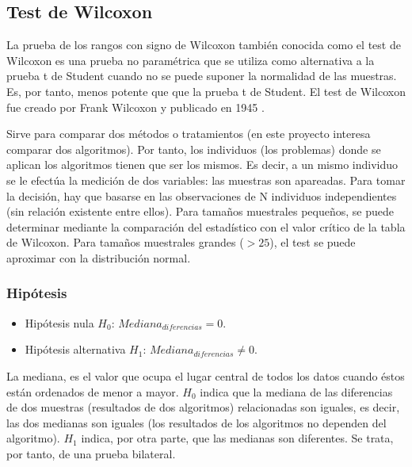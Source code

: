 
\subsection{Test de Wilcoxon}
La prueba de los rangos con signo de Wilcoxon también conocida como el test de Wilcoxon es una prueba no
paramétrica que se utiliza como alternativa a la prueba t de Student cuando no se puede suponer la normalidad
de las muestras. Es, por tanto, menos potente que que la prueba t de Student. El test de Wilcoxon fue creado
por Frank Wilcoxon y publicado en 1945 \cite{wilcoxon}.

Sirve para comparar dos métodos o tratamientos (en este proyecto interesa comparar dos algoritmos). Por tanto,
los individuos (los problemas) donde se aplican los algoritmos tienen que ser los mismos. Es decir, a un mismo
individuo se le efectúa la medición de dos variables: las muestras son apareadas. Para tomar la decisión, hay
que basarse en las observaciones de N individuos independientes (sin relación existente entre ellos). Para tamaños
muestrales pequeños, se puede determinar mediante la comparación del estadístico con el valor crítico de la
tabla de Wilcoxon. Para tamaños muestrales grandes ($> 25$), el test se puede aproximar con la distribución normal.

\subsubsection{Hipótesis}
\begin{itemize}
\item Hipótesis nula $H_0$: $Mediana_{diferencias} = 0$.
\item Hipótesis alternativa $H_1$: $Mediana_{diferencias} \neq 0$.
\end{itemize}
La mediana, es el valor que ocupa el lugar central de todos los datos cuando éstos están ordenados de menor a
mayor. $H_0$ indica que la mediana de las diferencias de dos muestras (resultados de dos algoritmos) relacionadas
son iguales, es decir, las dos medianas son iguales (los resultados de los algoritmos no dependen del algoritmo).
$H_1$ indica, por otra parte, que las medianas son diferentes. Se trata, por tanto, de una prueba bilateral.

